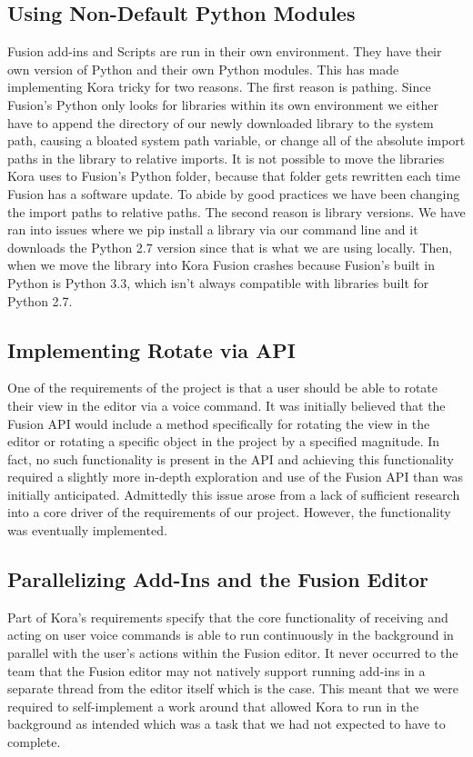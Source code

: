 \documentclass[onecolumn, draftclsnofoot,10pt, compsoc]{IEEEtran}
\begin{document}
	\subsection{Using Non-Default Python Modules}
		Fusion add-ins and Scripts are run in their own environment.
		They have their own version of Python and their own Python modules.
		This has made implementing Kora tricky for two reasons.
		The first reason is pathing.
		Since Fusion's Python only looks for libraries within its own environment we either have to append the directory of our newly downloaded library to the system path, causing a bloated system path variable, or change all of the absolute import paths in the library to relative imports.
		It is not possible to move the libraries Kora uses to Fusion's Python folder, because that folder gets rewritten each time Fusion has a software update.
		To abide by good practices we have been changing the import paths to relative paths.
		The second reason is library versions.
		We have ran into issues where we pip install a library via our command line and it downloads the Python 2.7 version since that is what we are using locally.
		Then, when we move the library into Kora Fusion crashes because Fusion's built in Python is Python 3.3, which isn't always compatible with libraries built for Python 2.7.

	\subsection{Implementing Rotate via API}
		One of the requirements of the project is that a user should be able to rotate their view in the editor via a voice command.
		It was initially believed that the Fusion API would include a method specifically for rotating the view in the editor or rotating a specific object in the project by a specified magnitude.
		In fact, no such functionality is present in the API and achieving this functionality required a slightly more in-depth exploration and use of the Fusion API than was initially anticipated.
		Admittedly this issue arose from a lack of sufficient research into a core driver of the requirements of our project.
		However, the functionality was eventually implemented.


   	 \subsection{Parallelizing Add-Ins and the Fusion Editor}
		Part of Kora's requirements specify that the core functionality of receiving and acting on user voice commands is able to run continuously in the background in parallel with the user's actions within the Fusion editor.
		It never occurred to the team that the Fusion editor may not natively support running add-ins in a separate thread from the editor itself which is the case.
		This meant that we were required to self-implement a work around that allowed Kora to run in the background as intended which was a task that we had not expected to have to complete.
\end{document}
